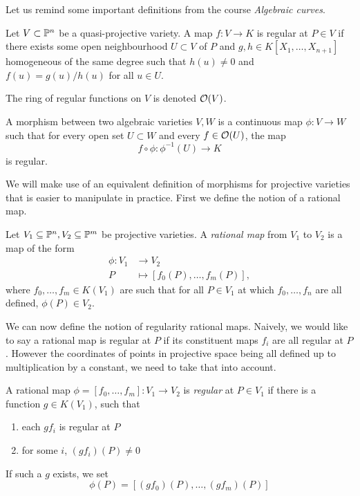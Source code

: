 Let us remind some important definitions from the course
\emph{Algebraic curves}.

\begin{definition}
	Let $V \subset \mathbb{P}^n$ be a quasi-projective variety. A map $f: V \to K$
	is regular at $P \in V$ if there exists some open neighbourhood
	$U \subset V$ of $P$ and $g, h \in K[X_1, \dots, X_{n+1}]$
	homogeneous of the same degree such that $h(u) \neq 0$
	and $f(u) = g(u)/h(u)$ for all $u \in U$.

	The ring of regular functions on $V$ is denoted $\mathcal{O}(V)$.
\end{definition}

\begin{definition}
	\label{def:regular}
	A morphism between two algebraic varieties $V, W$ is a continuous map
	$\phi: V \to W$ such that for every open set $U \subset W$
	and every $f \in \mathcal{O}(U)$, the map
	\begin{equation*}
		f\circ\phi: \phi^{-1}(U) \to K
	\end{equation*}
	is regular.
\end{definition}

We will make use of an equivalent definition of morphisms for
projective varieties that is easier to 
manipulate in practice. First we define the notion of a rational map.

\begin{definition}
	Let $V_1 \subseteq \mathbb{P}^n, V_2 \subseteq \mathbb{P}^m$ be projective varieties.
	A \emph{rational map} from $V_1$ to $V_2$ is a map of the form
	\begin{align*}
		\phi: V_1 &\to V_2\\
		P &\mapsto [f_0(P), \dots, f_m(P)],
	\end{align*}
	where $f_0, \dots, f_m \in K(V_1)$ are such that
	for all $P \in V_1$ at which $f_0, \dots, f_n$ are all defined, 
	$\phi(P) \in V_2$.
\end{definition}

We can now define the notion of regularity rational maps.
Naively, we would like to say a rational map is regular at $P$ if its
constituent maps $f_i$ are all regular at $P$.
However the coordinates of points in projective space being all defined up
to multiplication by a constant, we need to take that into account.

\begin{definition}
	A rational map $\phi = [f_0, \dots, f_m]: V_1 \to V_2$
	is \emph{regular} at $P \in V_1$ if there is a function $g \in K(V_1)$,
	such that
	\begin{enumerate}[label=(\roman*)]
		\item each $gf_i$ is regular at $P$
		\item for some $i$, $(gf_i)(P) \neq 0$
	\end{enumerate}
	If such a $g$ exists, we set
	\begin{equation*}
		\phi(P) = [(gf_0)(P), \dots, (gf_m)(P)]
	\end{equation*}
\end{definition}

